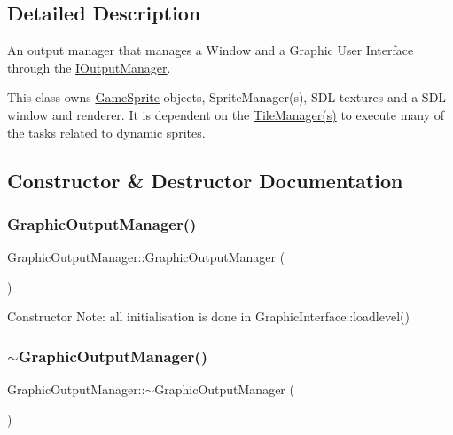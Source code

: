 \subsection{Detailed Description}
An output manager that manages a Window and a Graphic User Interface through the \mbox{\hyperlink{class_i_output_manager}{I\+Output\+Manager}}. 

This class owns \mbox{\hyperlink{class_game_sprite}{Game\+Sprite}} objects, Sprite\+Manager(s), S\+DL textures and a S\+DL window and renderer. It is dependent on the \mbox{\hyperlink{class_tile_manager}{Tile\+Manager(s)}} to execute many of the tasks related to dynamic sprites. 

\subsection{Constructor \& Destructor Documentation}
\mbox{\label{class_graphic_output_manager_adf8a096f7b671b182b74bb130ffd6b99}} 
\subsubsection{\texorpdfstring{Graphic\+Output\+Manager()}{GraphicOutputManager()}}
{\footnotesize\ttfamily Graphic\+Output\+Manager\+::\+Graphic\+Output\+Manager (\begin{DoxyParamCaption}{ }\end{DoxyParamCaption})}

Constructor Note\+: all initialisation is done in Graphic\+Interface\+::loadlevel() \mbox{\label{class_graphic_output_manager_a13de402f591b8bfa7a11d4c2b84dfd83}} 
\subsubsection{\texorpdfstring{$\sim$\+Graphic\+Output\+Manager()}{~GraphicOutputManager()}}
{\footnotesize\ttfamily Graphic\+Output\+Manager\+::$\sim$\+Graphic\+Output\+Manager (\begin{DoxyParamCaption}{ }\end{DoxyParamCaption})}

